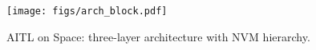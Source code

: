 \begin{figure}[ht]
\centering
\texttt{[image: figs/arch\_block.pdf]}
\caption{AITL on Space: three-layer architecture with NVM hierarchy.}
\label{fig:arch_block}
\end{figure}
